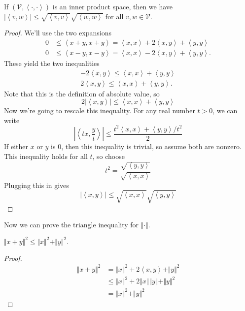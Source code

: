 \documentclass[10pt]{report}
\begin{document}
\begin{prop}
	If $(\mathcal{V},\left\langle \cdot,\cdot \right\rangle)$ is an inner product space, then we have $|\left\langle v,w \right\rangle| \leq \sqrt{\left\langle v,v \right\rangle} \sqrt{\left\langle w,w \right\rangle}$ for all $v,w \in \mathcal{V}$.
\end{prop}
\begin{proof}
	We'll use the two expansions
	\begin{align*}
		0 &\leq \left\langle x+y,x+y \right\rangle = \left\langle x,x \right\rangle+2\left\langle x,y \right\rangle+\left\langle y,y \right\rangle \\
		0 &\leq \left\langle x-y,x-y \right\rangle = \left\langle x,x \right\rangle-2\left\langle x,y \right\rangle+\left\langle y,y \right\rangle.
	\end{align*}
	These yield the two inequalities
	\begin{align*}
		-2\left\langle x,y \right\rangle\leq\left\langle x,x \right\rangle+\left\langle y,y \right\rangle \\
		2\left\langle x,y \right\rangle\leq\left\langle x,x \right\rangle+\left\langle y,y \right\rangle.
	\end{align*}
	Note that this is the definition of absolute value, so
	\[
	2 |\left\langle x,y \right\rangle| \leq \left\langle x,x \right\rangle+\left\langle y,y \right\rangle
	\] 
	Now we're going to rescale this inequality. For any real number $t >  0$, we can write
	\[
	\left| \left\langle tx,\frac{y}{t} \right\rangle  \right| \leq \frac{t^2\left\langle x,x \right\rangle + \left\langle y,y \right\rangle/t^2}{2} 
	\] 
	If either $x$ or $y$ is 0, then this inequality is trivial, so assume both are nonzero. This inequality holds for all $t$, so choose
	\[
	t^2 = \frac{\sqrt{\left\langle y,y \right\rangle} }{\sqrt{\left\langle x,x \right\rangle} } 
	\] 
	Plugging this in gives
	\[
	|\left\langle x,y \right\rangle| \leq \sqrt{\left\langle x,x \right\rangle} \sqrt{\left\langle y,y \right\rangle}   
	\] 
\end{proof}

Now we can prove the triangle inequality for $\Vert{\cdot}\Vert$.
\begin{prop}
	$\Vert{x+y}\Vert^2 \leq \Vert{x}\Vert^2 + \Vert{y}\Vert^2$.
\end{prop}
\begin{proof}
	\begin{align*}
		\Vert{x+y}\Vert^2 &= \Vert{x}\Vert^2 + 2\left\langle x,y \right\rangle + \Vert{y}\Vert^2 \\
				  &\leq \Vert{x}\Vert^2 + 2\Vert{x}\Vert\Vert{y}\Vert + \Vert{y}\Vert^2 \\
				  &= \Vert{x}\Vert^2 + \Vert{y}\Vert^2
	\end{align*}
\end{proof}
\end{document}
